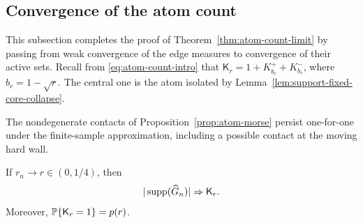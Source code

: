 \subsection{Convergence of the atom count}

This subsection completes the proof of Theorem~\ref{thm:atom-count-limit} by
passing from weak convergence of the edge measures to convergence of their
active sets. Recall from \eqref{eq:atom-count-intro} that
\(\mathsf K_r=1+K_{b_r}^++K_{b_r}^-\), where \(b_r=1-\sqrt r\). The central
one is the atom isolated by Lemma~\ref{lem:support-fixed-core-collapse}.

The nondegenerate contacts of Proposition~\ref{prop:atom-morse} persist
one-for-one under the finite-sample approximation, including a possible
contact at the moving hard wall.
\begin{proposition}
\label{prop:atom-count-convergence}
If \(r_n\to r\in(0,1/4)\), then
\[
    |\operatorname{supp}(\widehat G_n)|\Rightarrow\mathsf K_r.
\]
Moreover, \(\mathbb{P}\{\mathsf K_r=1\}=p(r)\).
\end{proposition}


